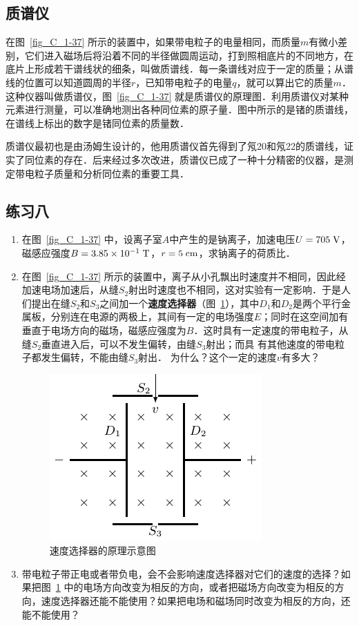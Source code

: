 \subsection{质谱仪}

在图~\ref{fig_C_1-37} 所示的装置中，如果带电粒子的电量相同，而质量$m$有微小差别，它们进入磁场后将沿着不同的半径做圆周运动，打到照相底片的不同地方，在底片上形成若干谱线状的细条，叫做质谱线．每一条谱线对应于一定的质量；从谱线的位置可以知道圆周的半径$r$，已知带电粒子的电量$q$，就可以算出它的质量$m$．这种仪器叫做质谱仪，图~\ref{fig_C_1-37} 就是质谱仪的原理图．利用质谱仪对某种元素进行测量，可以准确地测出各种同位素的原子量．图中所示的是锗的质谱线，在谱线上标出的数字是锗同位素的质量数．

质谱仪最初也是由汤姆生设计的，他用质谱仪首先得到了氖20和氖22的质谱线，证实了同位素的存在．后来经过多次改进，质谱仪已成了一种十分精密的仪器，是测定带电粒子质量和分析同位素的重要工具．


\subsection*{练习八}
\begin{enumerate}
    \item 在图~\ref{fig_C_1-37} 中，设离子室$A$中产生的是钠离子，加速电压$U=705 \;\text{V} $，磁感应强度$B=3. 85\times10^{-1} \;\text{T}$，$r=5 \;\text{cm}$，求钠离子的荷质比．
    \item 在图~\ref{fig_C_1-37} 所示的装置中，离子从小孔飘出时速度并不相同，因此经加速电场加速后，从缝$S_2$射出时速度也不相同，这对实验有一定影响．于是人们提出在缝$S_2$和$S_3$之间加一个\textbf{速度选择器}（图~\ref{fig_C_1-38}），其中$D_1$和$D_2$是两个平行金属板，分别连在电源的两极上，其间有一定的电场强度$E$；同时在这空间加有垂直于电场方向的磁场，磁感应强度为$B$．这时具有一定速度的带电粒子，从缝$S_2$垂直进入后，可以不发生偏转，由缝$S_3$射出；而具
有其他速度的带电粒子都发生偏转，不能由缝$S_3$射出．
为什么？这个一定的速度$v$有多大？
\begin{figure}[htbp]
    \centering
    \includegraphics{fig/C/1-38.pdf}
    \caption{速度选择器的原理示意图}\label{fig_C_1-38}
\end{figure}
\item 带电粒子带正电或者带负电，会不会影响速度选择器对它们的速度的选择？如果把图~\ref{fig_C_1-38} 中的电场方向改变为相反的方向，或者把磁场方向改变为相反的方向，速度选择器还能不能使用？如果把电场和磁场同时改变为相反的方向，还能不能使用？
\end{enumerate}

